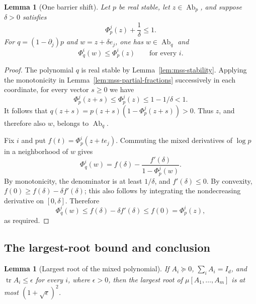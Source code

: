 \documentclass[11pt]{amsart}
\newtheorem{lemma}[theorem]{Lemma}
\theoremstyle{definition}
\theoremstyle{remark}
\numberwithin{equation}{section}
\begin{document}
\begin{lemma}[One barrier shift]
\label{lem:mss-barrier-shift}
Let $p$ be real stable, let $z\in\operatorname{Ab}_p$, and suppose
$\delta>0$ satisfies
\begin{equation}
 \Phi_p^j(z)+\frac1\delta\leq1.
 \label{eq:mss-shift-hypothesis}
\end{equation}
For $q=(1-\partial_j)p$ and $w=z+\delta e_j$, one has
$w\in\operatorname{Ab}_q$ and
\begin{equation}
 \Phi_q^i(w)\leq\Phi_p^i(z)\qquad\text{for every }i.
 \label{eq:mss-shift-conclusion}
\end{equation}
\end{lemma}

\begin{proof}
The polynomial $q$ is real stable by
Lemma~\ref{lem:mss-stability}.  Applying the monotonicity in
Lemma~\ref{lem:mss-partial-fractions} successively in each coordinate,
for every vector $s\geq0$ we have
\[
 \Phi_p^j(z+s)\leq\Phi_p^j(z)\leq1-1/\delta<1.
\]
It follows that
$q(z+s)=p(z+s)(1-\Phi_p^j(z+s))>0$.
Thus $z$, and therefore also $w$, belongs to $\operatorname{Ab}_q$.

Fix $i$ and put $f(t)=\Phi_p^i(z+te_j)$.
Commuting the mixed derivatives of $\log p$ in a neighborhood of
$w$ gives
\[
 \Phi_q^i(w)
 =f(\delta)-\frac{f'(\delta)}{1-\Phi_p^j(w)}.
\]
By monotonicity, the denominator is at least $1/\delta$, and
$f'(\delta)\leq0$.  By convexity,
$f(0)\geq f(\delta)-\delta f'(\delta)$; this also follows by
integrating the nondecreasing derivative on $[0,\delta]$.
Therefore
\[
 \Phi_q^i(w)
 \leq f(\delta)-\delta f'(\delta)
 \leq f(0)=\Phi_p^i(z),
\]
as required.
\end{proof}

\subsection{The largest-root bound and conclusion}

\begin{lemma}[Largest root of the mixed polynomial]
\label{lem:mss-root-bound}
If $A_i\succeq0$, $\sum_iA_i=I_d$, and
$\operatorname{tr}A_i\leq\epsilon$ for every $i$, where $\epsilon>0$,
then the largest root of $\mu[A_1,\ldots,A_m]$ is at most
$(1+\sqrt\epsilon)^2$.
\end{lemma}
\end{document}
